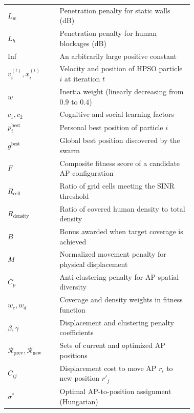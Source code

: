 \documentclass[conference]{IEEEtran}
\begin{document}
\begin{table}[htbp]
\begin{tabular}{@{} l >{\raggedright\arraybackslash}p{0.72\linewidth} @{}}
    $L_{w}$ & Penetration penalty for static walls (dB) \\
    $L_{h}$ & Penetration penalty for human blockages (dB) \\
    Inf & An arbitrarily large positive constant \\
    \midrule
    $v_i^{(t)}, x_i^{(t)}$ & Velocity and position of HPSO particle $i$ at iteration $t$ \\
    $w$ & Inertia weight (linearly decreasing from $0.9$ to $0.4$) \\
    $c_1, c_2$ & Cognitive and social learning factors \\
    $p_i^{\text{best}}$ & Personal best position of particle $i$ \\
    $g^{\text{best}}$ & Global best position discovered by the swarm \\
    $F$ & Composite fitness score of a candidate AP configuration \\
    $R_{\text{cell}}$ & Ratio of grid cells meeting the SINR threshold \\
    $R_{\text{density}}$ & Ratio of covered human density to total density \\
    $B$ & Bonus awarded when target coverage is achieved \\
    $M$ & Normalized movement penalty for physical displacement \\
    $C_p$ & Anti-clustering penalty for AP spatial diversity \\
    $w_c, w_d$ & Coverage and density weights in fitness function \\
    $\beta, \gamma$ & Displacement and clustering penalty coefficients \\
    $\mathcal{R}_{\text{prev}}, \mathcal{R}_{\text{new}}$ & Sets of current and optimized AP positions \\
    $C_{ij}$ & Displacement cost to move AP $r_i$ to new position $r'_j$ \\
    $\sigma^*$ & Optimal AP-to-position assignment (Hungarian) \\
    \bottomrule
  \end{tabular}
\end{table}

\renewcommand{\arraystretch}{1.0}
\setlength{\tabcolsep}{6pt}
\end{document}

